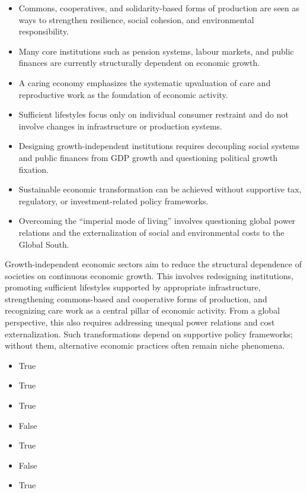 \documentclass[
  a4paper,
  DIV=11,
  numbers=noendperiod,
  oneside,
  openany]{scrreprt}
\providecommand{\tightlist}{%
  \setlength{\itemsep}{0pt}\setlength{\parskip}{0pt}}
\begin{document}
\begin{itemize}
\tightlist
\item[$\square$]
  Commons, cooperatives, and solidarity-based forms of production are
  seen as ways to strengthen resilience, social cohesion, and
  environmental responsibility.
\item[$\square$]
  Many core institutions such as pension systems, labour markets, and
  public finances are currently structurally dependent on economic
  growth.
\item[$\square$]
  A caring economy emphasizes the systematic upvaluation of care and
  reproductive work as the foundation of economic activity.
\item[$\square$]
  Sufficient lifestyles focus only on individual consumer restraint and
  do not involve changes in infrastructure or production systems.
\item[$\square$]
  Designing growth-independent institutions requires decoupling social
  systems and public finances from GDP growth and questioning political
  growth fixation.
\item[$\square$]
  Sustainable economic transformation can be achieved without supportive
  tax, regulatory, or investment-related policy frameworks.
\item[$\square$]
  Overcoming the ``imperial mode of living'' involves questioning global
  power relations and the externalization of social and environmental
  costs to the Global South.
\end{itemize}

Growth-independent economic sectors aim to reduce the structural
dependence of societies on continuous economic growth. This involves
redesigning institutions, promoting sufficient lifestyles supported by
appropriate infrastructure, strengthening commons-based and cooperative
forms of production, and recognizing care work as a central pillar of
economic activity. From a global perspective, this also requires
addressing unequal power relations and cost externalization. Such
transformations depend on supportive policy frameworks; without them,
alternative economic practices often remain niche phenomena.

\begin{itemize}
\tightlist
\item
  True
\item
  True
\item
  True
\item
  False
\item
  True
\item
  False
\item
  True
\end{itemize}
\end{document}
